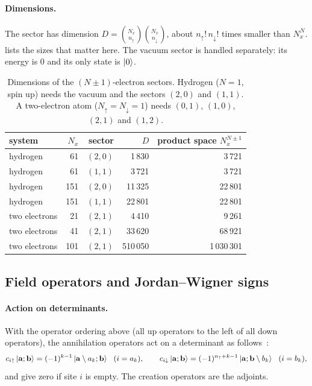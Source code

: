 \documentclass[11pt,a4paper]{article}
\newcommand{\Nx}{N_x}
\newcommand{\up}{{\uparrow}}
\newcommand{\dn}{{\downarrow}}
\begin{document}
\paragraph{Dimensions.} The sector has dimension $D = \binom{\Nx}{n_\up}\binom{\Nx}{n_\dn}$, about $n_\up!\,n_\dn!$ times smaller than $\Nx^N$.  lists the sizes that matter here. The vacuum sector is handled separately: its energy is $0$ and its only state is $\ket{0}$.

\begin{table}[t]
\centering\small
\caption{Dimensions of the $(N\pm1)$-electron sectors. Hydrogen ($N=1$, spin up) needs the vacuum and the sectors $(2,0)$ and $(1,1)$. A two-electron atom ($N_\up=N_\dn=1$) needs $(0,1)$, $(1,0)$, $(2,1)$ and $(1,2)$.}
\label{tab:dimensions}
\begin{tabular}{lrrrr}
\toprule
system & $\Nx$ & sector & $D$ & product space $\Nx^{N\pm1}$ \\
\midrule
hydrogen & 61 & $(2,0)$ & 1\,830 & 3\,721 \\
hydrogen & 61 & $(1,1)$ & 3\,721 & 3\,721 \\
hydrogen & 151 & $(2,0)$ & 11\,325 & 22\,801 \\
hydrogen & 151 & $(1,1)$ & 22\,801 & 22\,801 \\
two electrons & 21 & $(2,1)$ & 4\,410 & 9\,261 \\
two electrons & 41 & $(2,1)$ & 33\,620 & 68\,921 \\
two electrons & 101 & $(2,1)$ & 510\,050 & 1\,030\,301 \\
\bottomrule
\end{tabular}
\end{table}

\subsection{Field operators and Jordan--Wigner signs}
\label{sec:field-operators}

\paragraph{Action on determinants.} With the operator ordering above (all up operators to the left of all down operators), the annihilation operators act on a determinant as follows~\cite{jordan1928}:
\begin{equation}
c_{i\up}\ket{\mathbf a;\mathbf b} = (-1)^{k-1}\ket{\mathbf a\setminus a_k;\mathbf b}\ \ (i=a_k),\qquad
c_{i\dn}\ket{\mathbf a;\mathbf b} = (-1)^{n_\up+k-1}\ket{\mathbf a;\mathbf b\setminus b_k}\ \ (i=b_k),
\label{eq:jordan-wigner}
\end{equation}
and give zero if site $i$ is empty. The creation operators are the adjoints.
\end{document}
